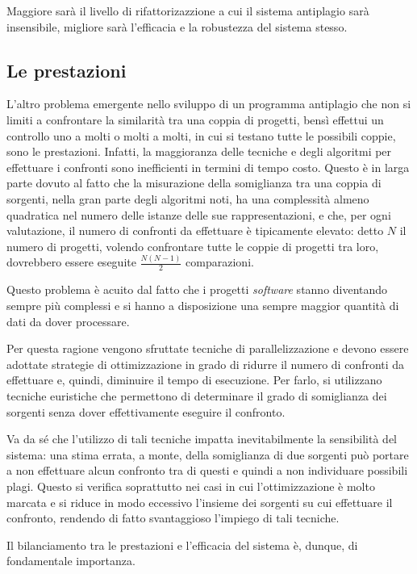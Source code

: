 Maggiore sarà il livello di rifattorizazzione a cui il sistema antiplagio sarà insensibile, migliore sarà l'efficacia e la robustezza del sistema stesso.

\subsection{Le prestazioni}
L'altro problema emergente nello sviluppo di un programma antiplagio che non si limiti a confrontare la similarità tra una coppia di progetti, bensì effettui un controllo uno a molti o molti a molti, in cui si testano tutte le possibili coppie, sono le prestazioni. 
%
Infatti, la maggioranza delle tecniche e degli algoritmi per effettuare i confronti sono inefficienti in termini di tempo costo. 
%
Questo è in larga parte dovuto al fatto che la misurazione della somiglianza tra una coppia di sorgenti, nella gran parte degli algoritmi noti, ha una complessità almeno quadratica nel numero delle istanze delle sue rappresentazioni, e che, per ogni valutazione, il numero di confronti da effettuare è tipicamente elevato: detto $N$ il numero di progetti, volendo confrontare tutte le coppie di progetti tra loro, dovrebbero essere eseguite $\frac{N(N-1)}{2}$ comparazioni.

Questo problema è acuito dal fatto che i progetti \textit{software} stanno diventando sempre più complessi e si hanno a disposizione una sempre maggior quantità di dati da dover processare.

Per questa ragione vengono sfruttate tecniche di parallelizzazione e devono essere adottate strategie di ottimizzazione in grado di ridurre il numero di confronti da effettuare e, quindi, diminuire il tempo di esecuzione.
%
Per farlo, si utilizzano tecniche euristiche che permettono di determinare il grado di somiglianza dei sorgenti senza dover effettivamente eseguire il confronto.

Va da sé che l'utilizzo di tali tecniche impatta inevitabilmente la sensibilità del sistema: una stima errata, a monte, della somiglianza di due sorgenti può portare a non effettuare alcun confronto tra di questi e quindi a non individuare possibili plagi. 
%
Questo si verifica soprattutto nei casi in cui l'ottimizzazione è molto marcata e si riduce in modo eccessivo l'insieme dei sorgenti su cui effettuare il confronto, rendendo di fatto svantaggioso l'impiego di tali tecniche.

Il bilanciamento tra le prestazioni e l'efficacia del sistema è, dunque, di fondamentale importanza.

